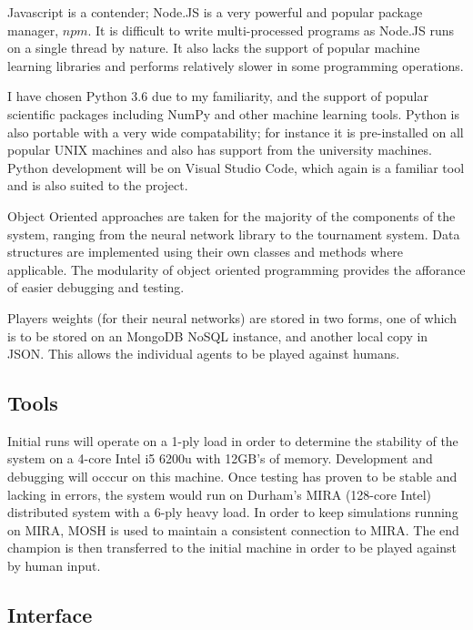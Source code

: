 \documentclass[12pt,a4paper]{article}
\begin{document}
    Javascript is a contender; Node.JS is a very powerful and popular package manager, $npm$. It is difficult to write multi-processed programs as Node.JS runs on a single thread by nature. It also lacks the support of popular machine learning libraries and performs relatively slower in some programming operations.

    I have chosen Python 3.6 due to my familiarity, and the support of popular scientific packages including NumPy and other machine learning tools. Python is also portable with a very wide compatability; for instance it is pre-installed on all popular UNIX machines and also has support from the university machines. Python development will be on Visual Studio Code, which again is a familiar tool and is also suited to the project.

    Object Oriented approaches are taken for the majority of the components of the system, ranging from the neural network library to the tournament system. Data structures are implemented using their own classes and methods where applicable. The modularity of object oriented programming provides the afforance of easier debugging and testing.

    Players weights (for their neural networks) are stored in two forms, one of which is to be stored on an MongoDB NoSQL instance, and another local copy in JSON. This allows the individual agents to be played against humans.

\subsection*{Tools}

    Initial runs will operate on a 1-ply load in order to determine the stability of the system on a 4-core Intel i5 6200u with 12GB's of memory. Development and debugging will occcur on this machine. Once testing has proven to be stable and lacking in errors, the system would run on Durham's MIRA (128-core Intel) distributed system with a 6-ply heavy load. In order to keep simulations running on MIRA, MOSH is used to maintain a consistent  connection to MIRA. The end champion is then transferred to the initial machine in order to be played against by human input.

\subsection*{Interface}
\end{document}
